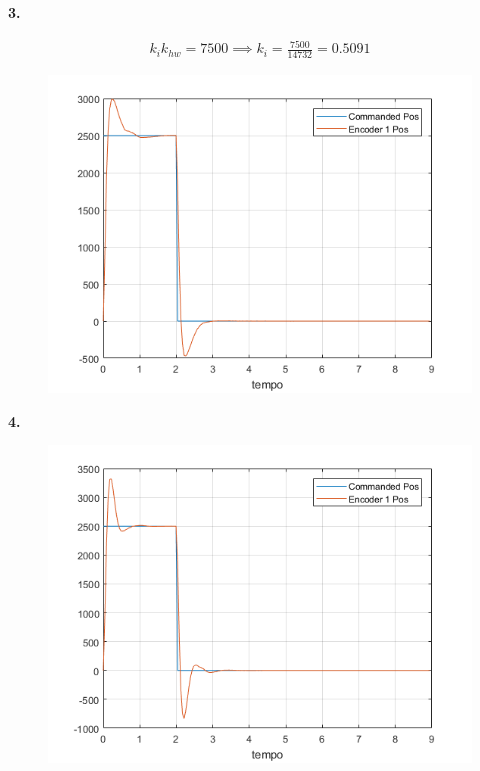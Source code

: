 \documentclass[a4paper,11pt]{article}
\begin{document}
\pagebreak

\textbf{3.}

\begin{gather*}
    k_i k_{hw} = 7500 \implies k_i = \frac{7500}{14732} = 0.5091
\end{gather*}


\begin{figure}[H]
\includegraphics[scale=0.9]{q03}
\centering
\end{figure}

\textbf{4.}

\begin{figure}[H]
\includegraphics[scale=0.9]{q04}
\centering
\end{figure}
\end{document}
